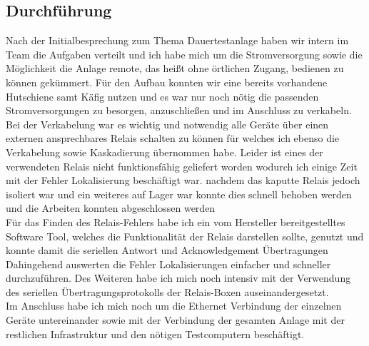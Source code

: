 \subsection{Durchführung}
Nach der Initialbesprechung zum Thema Dauertestanlage  haben wir intern im Team die Aufgaben verteilt und ich habe mich um die Stromversorgung sowie die Möglichkeit die Anlage remote, das heißt ohne örtlichen Zugang, bedienen zu können gekümmert.  Für den Aufbau konnten wir eine bereits vorhandene Hutschiene samt Käfig nutzen und es war nur noch nötig  die passenden Stromversorgungen zu besorgen, anzuschließen und im Anschluss zu verkabeln.  \\
Bei der Verkabelung war es wichtig und notwendig alle Geräte über einen externen ansprechbares Relais schalten zu können für welches ich ebenso die Verkabelung sowie Kaskadierung übernommen habe. Leider  ist eines der verwendeten Relais nicht funktionsfähig geliefert worden wodurch ich einige Zeit mit der Fehler Lokalisierung beschäftigt war. nachdem das kaputte Relais jedoch isoliert war und ein weiteres auf Lager war konnte dies schnell behoben werden und die Arbeiten konnten abgeschlossen werden \\
Für das Finden des Relais-Fehlers habe ich ein vom Hersteller bereitgestelltes Software Tool, welches die Funktionalität der Relais darstellen sollte, genutzt und konnte damit die seriellen Antwort und Acknowledgement Übertragungen Dahingehend auswerten die Fehler Lokalisierungen einfacher und schneller durchzuführen. Des Weiteren habe ich mich noch intensiv mit der Verwendung des seriellen Übertragungsprotokolls der Relais-Boxen auseinandergesetzt. \\
Im Anschluss habe ich mich noch um die Ethernet Verbindung der einzelnen Geräte untereinander sowie mit der Verbindung der gesamten Anlage mit der restlichen Infrastruktur und den nötigen Testcomputern beschäftigt.  \\

